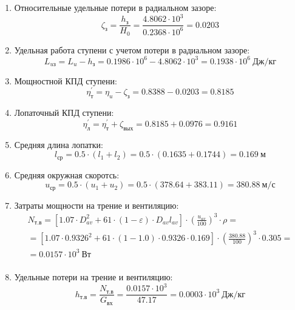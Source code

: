 \documentclass[a4paper,12pt]{article}
\begin{document}
\begin{enumerate}
        \item Относительные удельные потери в радиальном зазоре:
        \[
            \zeta_з = \frac{ h_з }{ H_0 } =
                \frac{ 4.8062 \cdot 10^3 }{ 0.2368 \cdot 10^6 } =
            0.0203
        \]

        \item Удельная работа ступени с учетом потери в радиальном зазоре:
        \[
            L_{uз} = L_u - h_з = 0.1986 \cdot 10^6 -
                4.8062 \cdot 10^3 =
            0.1938 \cdot 10^6 \ Дж/кг
        \]

        \item Мощностной КПД ступени:
        \[
            \eta_т^\prime = \eta_u - \zeta_з =
                0.8388 - 0.0203 = 0.8185
        \]

        \item Лопаточный КПД ступени:
        \[
            \eta_л^\prime = \eta_т^\prime + \zeta_{вых} =
                 0.8185 +  0.0976 =
            0.9161
        \]

        \item Средняя длина лопатки:
        \[
            l_{ср} = 0.5 \cdot (l_1 + l_2) =
                0.5 \cdot (0.1635 + 0.1744) =
            0.169\ м
        \]

        \item Средняя окружная скоротсь:
        \[
            u_{ср} = 0.5 \cdot (u_1 + u_2) =
                0.5 \cdot (378.64 + 383.11) =
            380.88\ м/с
        \]

        \item Затраты мощности на трение и вентиляцию:
        \begin{gather*}
            N_{т.в} = \left[
                    1.07 \cdot D_{av}^2 + 61 \cdot (1 - \varepsilon) \cdot D_{av} l_{av}
            \right] \cdot
            \left(
                \frac{ u_{av} }{ 100 }
            \right) ^ 3 \cdot
            \rho =\\
            = \left[
                1.07 \cdot 0.9326^2 +
                61 \cdot (1 - 1.0) \cdot
                0.9326 \cdot 0.169
            \right] \cdot
            \left(
                \frac{ 380.88 }{ 100 }
            \right) ^ 3 \cdot
            0.305=\\
            = 0.0157 \cdot 10^3 \ Вт \\
        \end{gather*}

        \item Удельные потери на трение и вентиляцию:
        \[
            h_{т.в} = \frac{ N_{т.в} }{ G_{вх} } =
                \frac{
                    0.0157 \cdot 10^3
                }{
                    47.17
                }
            = 0.0003 \cdot 10^3 \ Дж/кг
        \]


\end{enumerate}
\end{document}
